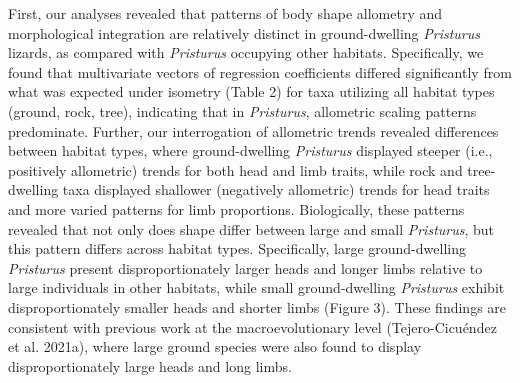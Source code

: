 \documentclass[
  11pt,
]{article}
\begin{document}
First, our analyses revealed that patterns of body shape allometry and
morphological integration are relatively distinct in ground-dwelling
\emph{Pristurus} lizards, as compared with \emph{Pristurus} occupying
other habitats. Specifically, we found that multivariate vectors of
regression coefficients differed significantly from what was expected
under isometry (Table 2) for taxa utilizing all habitat types (ground,
rock, tree), indicating that in \emph{Pristurus}, allometric scaling
patterns predominate. Further, our interrogation of allometric trends
revealed differences between habitat types, where ground-dwelling
\emph{Pristurus} displayed steeper (i.e., positively allometric) trends
for both head and limb traits, while rock and tree-dwelling taxa
displayed shallower (negatively allometric) trends for head traits and
more varied patterns for limb proportions. Biologically, these patterns
revealed that not only does shape differ between large and small
\emph{Pristurus}, but this pattern differs across habitat types.
Specifically, large ground-dwelling \emph{Pristurus} present
disproportionately larger heads and longer limbs relative to large
individuals in other habitats, while small ground-dwelling
\emph{Pristurus} exhibit disproportionately smaller heads and shorter
limbs (Figure 3). These findings are consistent with previous work at
the macroevolutionary level (Tejero-Cicuéndez et al. 2021a), where large
ground species were also found to display disproportionately large heads
and long limbs. \hfill\break
\end{document}

